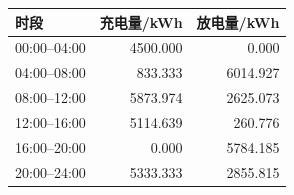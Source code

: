 \begin{tabular}{lrr}
\toprule
时段 & 充电量/kWh & 放电量/kWh \\
\midrule
00:00--04:00 & 4500.000 & 0.000 \\
04:00--08:00 & 833.333 & 6014.927 \\
08:00--12:00 & 5873.974 & 2625.073 \\
12:00--16:00 & 5114.639 & 260.776 \\
16:00--20:00 & 0.000 & 5784.185 \\
20:00--24:00 & 5333.333 & 2855.815 \\
\bottomrule
\end{tabular}
